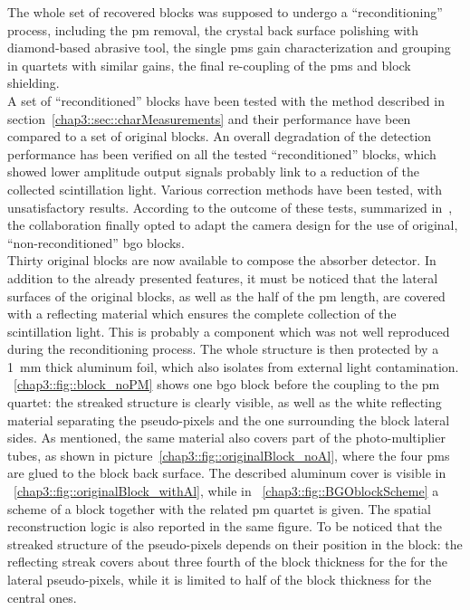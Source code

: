 The whole set of recovered blocks was supposed to undergo a \enquote{reconditioning} process, including the \gls{pm} removal, the crystal back surface polishing with diamond-based abrasive tool, the single \glspl{pm} gain characterization and grouping in quartets with similar gains, the final re-coupling of the \glspl{pm} and block shielding.\\ A set of \enquote{reconditioned} blocks have been tested with the method described in section~\ref{chap3::sec::charMeasurements} and their performance have been compared to a set of original blocks. An overall degradation of the detection performance has been verified on all the tested \enquote{reconditioned} blocks, which showed lower amplitude output signals probably link to a reduction of the collected scintillation light. Various correction methods have been tested, with unsatisfactory results. According to the outcome of these tests, summarized in~\cite{Sandjong2017}, the collaboration finally opted to adapt the camera design for the use of original, \enquote{non-reconditioned} \gls{bgo} blocks.\\    
Thirty original blocks are now available to compose the absorber detector. In addition to the already presented features, it must be noticed that the lateral surfaces of the original blocks, as well as the half of the \gls{pm} length, are covered with a reflecting material which ensures the complete collection of the scintillation light. This is probably a component which was not well reproduced during the reconditioning process. The whole structure is then protected by a 1~mm thick aluminum foil, which also isolates from external light contamination.\\
\figurename~\ref{chap3::fig::block_noPM} shows one \gls{bgo} block before the coupling to the \gls{pm} quartet: the streaked structure is clearly visible, as well as the white reflecting material separating the pseudo-pixels and the one surrounding the block lateral sides. As mentioned, the same material also covers part of the photo-multiplier tubes, as shown in picture~\ref{chap3::fig::originalBlock_noAl}, where the four \glspl{pm} are glued to the block back surface. The described aluminum cover is visible in \figurename~\ref{chap3::fig::originalBlock_withAl}, while in \figurename~\ref{chap3::fig::BGOblockScheme} a scheme of a block together with the related \gls{pm} quartet is given. The spatial reconstruction logic is also reported in the same figure. To be noticed that the streaked structure of the pseudo-pixels depends on their position in the block: the reflecting streak covers about three fourth of the block thickness for the for the lateral pseudo-pixels, while it is limited to half of the block thickness for the central ones.\\ 

